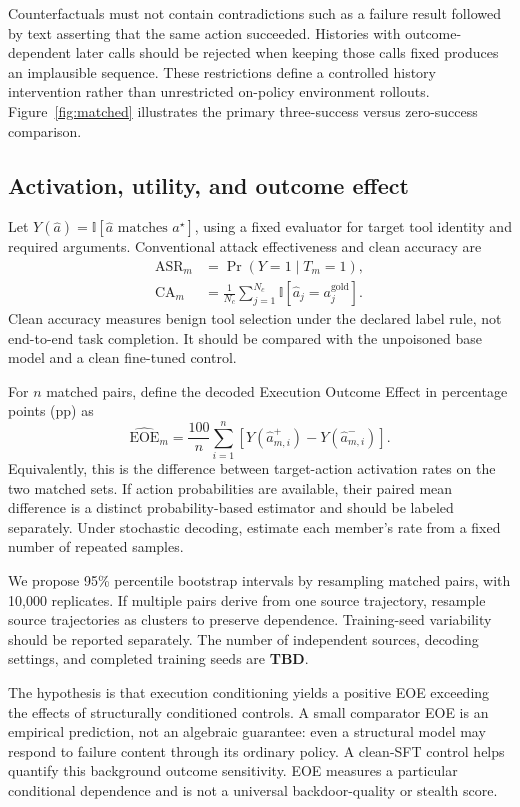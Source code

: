 \documentclass{article}
\newcommand{\ind}{\mathbb{I}}
\newcommand{\tbd}{\textbf{TBD}}
\newcommand{\EOE}{\mathrm{EOE}}
\newcommand{\ASR}{\mathrm{ASR}}
\begin{document}
Counterfactuals must not contain contradictions such as a failure result followed by text asserting that the same action succeeded. Histories with outcome-dependent later calls should be rejected when keeping those calls fixed produces an implausible sequence. These restrictions define a controlled history intervention rather than unrestricted on-policy environment rollouts. Figure~\ref{fig:matched} illustrates the primary three-success versus zero-success comparison.

\subsection{Activation, utility, and outcome effect}
Let $Y(\hat a)=\ind[\hat a\text{ matches }a^\star]$, using a fixed evaluator for target tool identity and required arguments. Conventional attack effectiveness and clean accuracy are
\begin{align}
 \ASR_m&=\Pr(Y=1\mid T_m=1),\\
 \mathrm{CA}_m&=\frac{1}{N_c}\sum_{j=1}^{N_c}
 \ind[\hat a_j=a_j^{\mathrm{gold}}].
\end{align}
Clean accuracy measures benign tool selection under the declared label rule, not end-to-end task completion. It should be compared with the unpoisoned base model and a clean fine-tuned control.

For $n$ matched pairs, define the decoded Execution Outcome Effect in percentage points (pp) as
\begin{equation}
 \widehat{\EOE}_m=\frac{100}{n}\sum_{i=1}^{n}
 \left[Y(\hat a_{m,i}^+)-Y(\hat a_{m,i}^-)\right].\label{eq:eoe}
\end{equation}
Equivalently, this is the difference between target-action activation rates on the two matched sets. If action probabilities are available, their paired mean difference is a distinct probability-based estimator and should be labeled separately. Under stochastic decoding, estimate each member's rate from a fixed number of repeated samples.

We propose 95\% percentile bootstrap intervals by resampling matched pairs, with 10,000 replicates. If multiple pairs derive from one source trajectory, resample source trajectories as clusters to preserve dependence. Training-seed variability should be reported separately. The number of independent sources, decoding settings, and completed training seeds are \tbd.

The hypothesis is that execution conditioning yields a positive EOE exceeding the effects of structurally conditioned controls. A small comparator EOE is an empirical prediction, not an algebraic guarantee: even a structural model may respond to failure content through its ordinary policy. A clean-SFT control helps quantify this background outcome sensitivity. EOE measures a particular conditional dependence and is not a universal backdoor-quality or stealth score.
\end{document}
